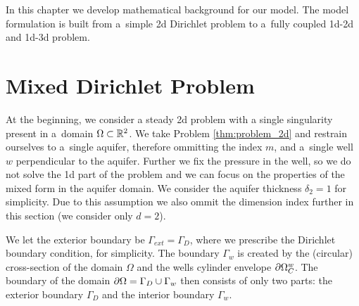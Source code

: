 
% 

In this chapter we develop mathematical background for our model.
The model formulation is built from a~simple 2d Dirichlet problem to a~fully coupled 1d-2d and 1d-3d problem.



\section{Mixed Dirichlet Problem}

At the beginning, we consider a steady 2d problem with a single singularity present in a~domain $\Omega\subset\mathbb{R}^2$.
We take Problem \ref{thm:problem_2d} and restrain ourselves to a~single aquifer, therefore ommitting the index $m$,
and a~single well $w$ perpendicular to the aquifer. Further we fix the pressure in the well,
so we do not solve the 1d part of the problem
and we can focus on the properties of the mixed form in the aquifer domain.
We consider the aquifer thickness $\delta_2=1$ for simplicity.
Due to this assumption we also ommit the dimension index further in this section (we consider only $d=2$).

We let the exterior boundary be  $\Gamma_{ext}=\Gamma_D$, where we prescribe the Dirichlet boundary condition, for simplicity.
The boundary $\Gamma_w$ is created by the (circular) cross-section of the domain $\Omega$
and the wells cylinder envelope $\partial\Omega^w_C$.
The boundary of the domain $\partial\Omega=\Gamma_D \cup \Gamma_w$ then consists of only two parts: the exterior boundary $\Gamma_D$
and the interior boundary $\Gamma_w$.

